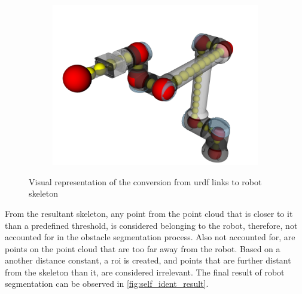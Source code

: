 \begin{figure}[h]
\begin{subfigure}{.33\linewidth}
        \includegraphics[width=.95\linewidth]{figs/chp4/self_ident_skeleton.png}
    \end{subfigure}
    \caption{Visual representation of the conversion from \ac{urdf} links to robot skeleton}
    \label{fig:links_to_points}
\end{figure}

\par From the resultant skeleton, any point from the point cloud that is closer to it than a predefined threshold, is considered belonging to the robot, therefore, not accounted for in the obstacle segmentation process. Also not accounted for, are points on the point cloud that are too far away from the robot. Based on a another distance constant, a \ac{roi} is created, and points that are further distant from the skeleton than it, are considered irrelevant. The final result of robot segmentation can be observed in \autoref{fig:self_ident_result}.

